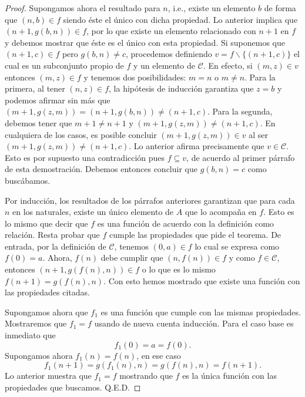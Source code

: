 \documentclass[letter,10pt,notitlepage]{amsart}
\theoremstyle{definition}
\theoremstyle{remark}
\begin{document}
\begin{proof}
  Supongamos ahora el resultado para \( n\), i.e., existe un
  elemento \( b\) de forma que \( (n,b) \in f\) siendo éste el único
  con dicha propiedad. Lo anterior implica que
  \( (n+1,g(b,n)) \in f\), por lo que existe un elemento relacionado
  con \( n+1\) en \( f\) y debemos mostrar que éste es el único
  con esta propiedad. Si suponemos que \( (n+1,c) \in f\)
  pero \( g(b,n) \neq c\), procedemos definiendo \( v = f \backslash\{(n+1,c)\}\) 
  el cual es un subconjunto propio de \( f\) y un elemento de \( \mathcal{C} \).
  En efecto, si \( (m,z) \in v \) entonces \( (m,z) \in f \) y tenemos dos posibilidades:
  \( m = n \) o \( m \neq n \). Para la primera, al tener \( (n,z) \in f \), la hipótesis
  de inducción garantiza que \( z = b \) y podemos afirmar sin más que 
  \( (m+1,g(z,m)) = (n+1,g(b,n)) \neq (n+1,c) \).
  Para la segunda, debemos tener que \( m+1 \neq n+1 \) y \( (m+1,g(z,m)) \neq (n+1,c) \).
  En cualquiera de los casos, es posible concluir \( (m+1,g(z,m)) \in v \) al ser 
  \( (m+1,g(z,m)) \neq (n+1,c)  \). Lo anterior afirma precisamente que \( v \in \mathcal{C} \). 
  Esto es por supuesto una contradicción pues \( f \subseteq v \),
  de acuerdo al primer párrafo de esta demostración. Debemos entonces
  concluir que \( g(b,n) = c\) como buscábamos.

  Por inducción, los resultados de los párrafos anteriores garantizan
  que para cada \( n\) en los naturales, existe un único elemento de \( A\)
  que lo acompaña en \( f\). Esto es lo mismo que decir que \( f\) es una función
  de acuerdo con la definición como relación. Resta probar que \( f \) cumple las propiedades que pide 
  el teorema. De entrada, por la definición  de \( \mathcal{C} \), tenemos \( (0,a) \in f\) lo
  cual se expresa como \( f(0) = a \). Ahora, \( f(n) \) debe cumplir que
  \( (n, f(n)) \in f \) y como \( f \in \mathcal{C} \), entonces \( (n+1, g(f(n),n)) \in f \) o lo
  que es lo mismo \( f(n+1) = g(f(n),n) \). Con esto hemos mostrado que existe una
  función con las propiedades citadas.

  Supongamos ahora que \( f_1\) es una función que cumple con las mismas propiedades.
  Mostraremos que \( f_1 = f\) usando de nueva cuenta inducción. Para el caso
  base es inmediato que
  \[ f_1(0) = a = f(0).\]
  Supongamos ahora \( f_1(n) = f(n)\), en ese caso
  \[ f_1(n+1) = g(f_1(n),n) = g(f(n),n) = f(n+1).\]
  Lo anterior muestra que \( f_1 = f\) mostrando que \( f\) es la única función con las propiedades
  que buscamos. Q.E.D.
\end{proof}
\end{document}

